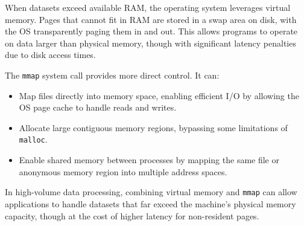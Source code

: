\documentclass[11pt,letterpaper,oneside]{article}
\begin{document}
When datasets exceed available RAM, the operating system leverages virtual
memory. Pages that cannot fit in RAM are stored in a swap area on disk, with the
OS transparently paging them in and out. This allows programs to operate on data
larger than physical memory, though with significant latency penalties due to
disk access times.

The \texttt{mmap} system call provides more direct control. It can:

\begin{itemize}
    \item Map files directly into memory space, enabling efficient I/O by
    allowing the OS page cache to handle reads and writes.
    \item Allocate large contiguous memory regions, bypassing some limitations
    of \texttt{malloc}.
    \item Enable shared memory between processes by mapping the same file or
    anonymous memory region into multiple address spaces.
\end{itemize}

In high-volume data processing, combining virtual memory and \texttt{mmap} can
allow applications to handle datasets that far exceed the machine’s physical
memory capacity, though at the cost of higher latency for non-resident pages.


\printbibliography
\end{document}
